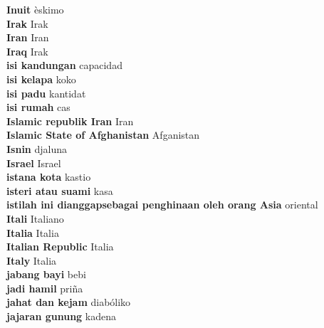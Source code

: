 \textbf{ Inuit  } èskimo \\
\textbf{ Irak  } Irak \\
\textbf{ Iran  } Iran \\
\textbf{ Iraq  } Irak \\
\textbf{ isi kandungan  } capacidad \\
\textbf{ isi kelapa  } koko \\
\textbf{ isi padu  } kantidat \\
\textbf{ isi rumah  } cas \\
\textbf{ Islamic republik Iran  } Iran \\
\textbf{ Islamic State of Afghanistan  } Afganistan \\
\textbf{ Isnin  } djaluna \\
\textbf{ Israel  } Israel \\
\textbf{ istana kota  } kastio \\
\textbf{ isteri atau suami  } kasa \\
\textbf{ istilah ini dianggapsebagai penghinaan oleh orang Asia  } oriental \\
\textbf{ Itali  } Italiano \\
\textbf{ Italia  } Italia \\
\textbf{ Italian Republic  } Italia \\
\textbf{ Italy  } Italia \\
\textbf{ jabang bayi  } bebi \\
\textbf{ jadi hamil  } priña \\
\textbf{ jahat dan kejam  } diabóliko \\
\textbf{ jajaran gunung  } kadena \\

